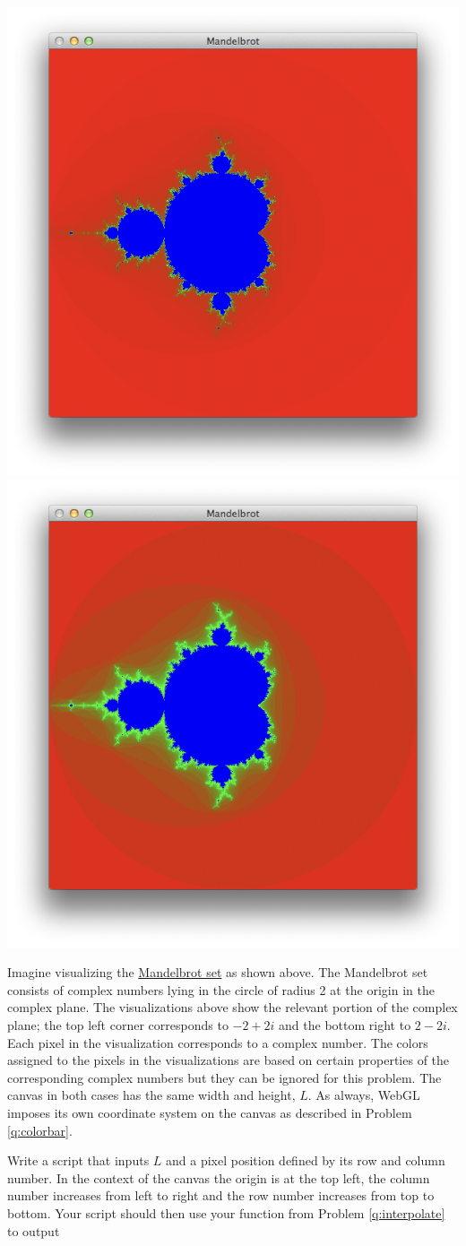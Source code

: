 \documentclass[addpoints]{exam}
\begin{document}
\begin{questions}
  \begin{center}
      \includegraphics[width=.46\linewidth]{mandelbrot1} \includegraphics[width=.46\linewidth]{mandelbrot2}\\
  \end{center}

  Imagine visualizing the \href{http://en.wikipedia.org/wiki/Mandelbrot_set}{Mandelbrot set} as shown above. The Mandelbrot set consists of complex numbers lying in the circle of radius 2 at the origin in the complex plane. The visualizations above show the relevant portion of the complex plane; the top left corner corresponds to $-2+2i$ and the bottom right to $2-2i$. Each pixel in the visualization corresponds to a complex number. The colors assigned to the pixels in the visualizations are based on certain properties of the corresponding complex numbers but they can be ignored for this problem. The canvas in both cases has the same width and height, $L$. As always, WebGL imposes its own coordinate system on the canvas as described in Problem \ref{q:colorbar}.

  Write a script that inputs $L$ and a pixel position defined by its row and column number. In the context of the canvas the origin is at the top left, the column number increases from left to right and the row number increases from top to bottom. Your script should then use your function from Problem \ref{q:interpolate} to output
  \begin{parts}

\end{parts}
\end{questions}
\end{document}
